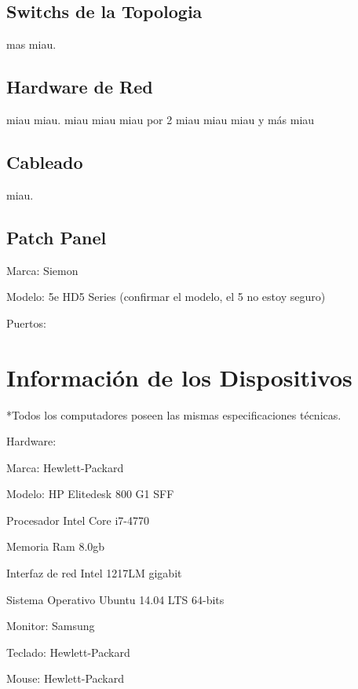 \documentclass[spanish]{udpreport}
\begin{document}
\section{Switchs de la Topologia}
mas miau.

\section{Hardware de Red}
miau miau.
miau miau miau por 2
miau miau miau y más miau
\section{Cableado}
miau.

\section{Patch Panel}
Marca: Siemon

Modelo: 5e HD5 Series (confirmar el modelo, el 5 no estoy seguro)

Puertos:

\chapter{Información de los Dispositivos}
	*Todos los computadores poseen las mismas especificaciones técnicas.
    
	Hardware:
    
			Marca: Hewlett-Packard
        
			Modelo: HP Elitedesk 800 G1 SFF
        
			Procesador Intel Core i7-4770
        
			Memoria Ram 8.0gb
        
			Interfaz de red Intel 1217LM gigabit
        
			Sistema Operativo Ubuntu 14.04 LTS 64-bits
        
	Monitor: Samsung
    
	Teclado: Hewlett-Packard
    
	Mouse: Hewlett-Packard
    
    
    
\end{document}
